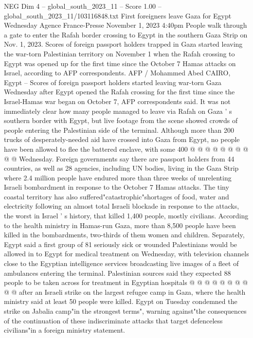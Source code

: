 \begin{textsample}{NEG Dim 4 – global\_south\_2023\_11 – Score 1.00 – global\_south\_2023\_11/103116848.txt}  \label{ex:f4_neg_303}
First foreigners leave Gaza for Egypt Wednesday Agence France-Presse November 1, 2023 4:40pm People walk through a gate to enter the Rafah border crossing to Egypt in the southern Gaza Strip on Nov. 1, 2023.
Scores of foreign passport holders trapped in Gaza started leaving the war-torn Palestinian territory on November 1 when the Rafah crossing to Egypt was opened up for the first time since the October 7 Hamas attacks on Israel, according to AFP correspondents.
AFP / Mohammed Abed CAIRO, Egypt -- Scores of foreign passport holders started leaving war-torn Gaza Wednesday after Egypt opened the Rafah crossing for the first time since the Israel-Hamas war began on October 7, AFP correspondents said.
It was not immediately clear how many people managed to leave via Rafah on Gaza ' s southern border with Egypt, but live footage from the scene showed crowds of people entering the Palestinian side of the terminal.
Although more than 200 trucks of desperately-needed aid have crossed into Gaza from Egypt, no people have been allowed to flee the battered enclave, with some 400 @ @ @ @ @ @ @ @ @ @ Wednesday.
Foreign governments say there are passport holders from 44 countries, as well as 28 agencies, including UN bodies, living in the Gaza Strip where 2.4 million people have endured more than three weeks of unrelenting Israeli bombardment in response to the October 7 Hamas attacks.
The tiny coastal territory has also suffered"catastrophic"shortages of food, water and electricity following an almost total Israeli blockade in response to the attacks, the worst in Israel ' s history, that killed 1,400 people, mostly civilians.
According to the health ministry in Hamas-run Gaza, more than 8,500 people have been killed in the bombardments, two-thirds of them women and children.
Separately, Egypt said a first group of 81 seriously sick or wounded Palestinians would be allowed in to Egypt for medical treatment on Wednesday, with television channels close to the Egyptian intelligence services broadcasting live images of a fleet of ambulances entering the terminal.
Palestinian sources said they expected 88 people to be taken across for treatment in Egyptian hospitals @ @ @ @ @ @ @ @ @ @ after an Israeli strike on the largest refugee camp in Gaza, where the health ministry said at least 50 people were killed.
Egypt on Tuesday condemned the strike on Jabalia camp"in the strongest terms", warning against"the consequences of the continuation of these indiscriminate attacks that target defenceless civilians"in a foreign ministry statement.

\end{textsample}
